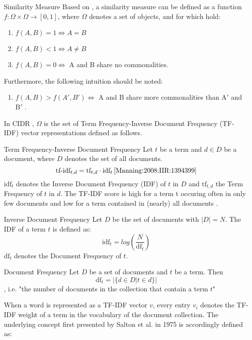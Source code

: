 \begin{definition}{Similarity Measure}
\label{SIM}
Based on \cite{Lin:1998:IDS:645527.657297}, a similarity measure can be defined as a function $f : \Omega \times \Omega \rightarrow [0,1]$, where $\Omega$ denotes a set of objects, and for which hold:
\begin{enumerate}
\item $f(A,B) = 1 \Leftrightarrow A = B$ \cite{Lin:1998:IDS:645527.657297}
\item $f(A,B) < 1 \Leftrightarrow A \neq B$ \cite{Lin:1998:IDS:645527.657297}
\item $f(A,B) = 0 \Leftrightarrow $ A and B share no commonalities. \cite{Lin:1998:IDS:645527.657297}
\end{enumerate}
Furthermore, the following intuition should be noted:
\begin{enumerate}[resume]
\item $f(A,B) > f(A\prime,B\prime) \Leftrightarrow $ A and B share more commonalities than A$\prime$ and B$\prime$ \cite{Lin:1998:IDS:645527.657297}.
\end{enumerate}
\end{definition}
In CIDR \cite{Radev1999ADO}, $\Omega$ is the set of Term Frequency-Inverse Document Frequency (TF-IDF) vector representations defined as follows.
\begin{definition}{Term Frequency-Inverse Document Frequency}
\label{TFIDF}
Let $t$ be a term and $d \in D$ be a document, where $D$ denotes the set of all documents.
\begin{equation}
\text{tf-idf}_{t,d} = \text{tf}_{t,d} \cdot \text{idf}_t \, \cite{Manning:2008:IIR:1394399}
\end{equation}
$\text{idf}_t$ denotes the Inverse Document Frequency (IDF) of $t$ in $D$ and $\text{tf}_{t,d}$ the Term Frequency of $t$ in $d$.
The TF-IDF score is high for a term t occuring often in only few documents and low for a term contained in (nearly) all documents \cite{Manning:2008:IIR:1394399}.
\end{definition}
\begin{definition}{Inverse Document Frequency}
\label{IDF} Let $D$ be the set of documents with $|D| = N$. The IDF of a term $t$ is defined as: 
\begin{equation}
\text{idf}_t = log(\dfrac{N}{\text{df}_t})
\end{equation}
$\text{df}_t$ denotes the Document Frequency of $t$.
\end{definition}
\begin{definition}{Document Frequency} Let $D$ be a set of documents and $t$ be a term. Then
\begin{equation}
\text{df}_t = |\{d \in D| t \in d\}|
\end{equation}, i.e. "the number of documents in the collection that contain a term $t$" \cite{Manning:2008:IIR:1394399}
\end{definition}
When a word is represented as a TF-IDF vector $v$, every entry $v_i$ denotes the TF-IDF weight of a term in the vocabulary of the document collection. The underlying concept first presented by Salton et al. \cite{Salton:1975:VSM:361219.361220} in 1975 is accordingly defined as:

